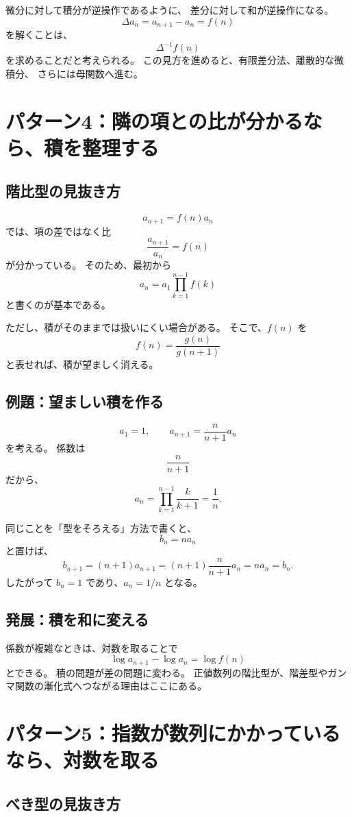 微分に対して積分が逆操作であるように、
差分に対して和が逆操作になる。
\[
  \Delta a_n=a_{n+1}-a_n=f(n)
\]
を解くことは、
\[
  \Delta^{-1}f(n)
\]
を求めることだと考えられる。
この見方を進めると、有限差分法、離散的な微積分、
さらには母関数へ進む。

\section{パターン4：隣の項との比が分かるなら、積を整理する}

\subsection{階比型の見抜き方}

\[
  a_{n+1}=f(n)a_n
\]
では、項の差ではなく比
\[
  \frac{a_{n+1}}{a_n}=f(n)
\]
が分かっている。
そのため、最初から
\[
  a_n=a_1\prod_{k=1}^{n-1}f(k)
\]
と書くのが基本である。

ただし、積がそのままでは扱いにくい場合がある。
そこで、$f(n)$ を
\[
  f(n)=\frac{g(n)}{g(n+1)}
\]
と表せれば、積が望ましく消える。

\subsection{例題：望ましい積を作る}

\[
  a_1=1,\qquad
  a_{n+1}=\frac{n}{n+1}a_n
\]
を考える。
係数は
\[
  \frac{n}{n+1}
\]
だから、
\[
  a_n
  =\prod_{k=1}^{n-1}\frac{k}{k+1}
  =\frac1n.
\]

同じことを「型をそろえる」方法で書くと、
\[
  b_n=na_n
\]
と置けば、
\[
  b_{n+1}
  =(n+1)a_{n+1}
  =(n+1)\frac{n}{n+1}a_n
  =na_n=b_n.
\]
したがって $b_n=1$ であり、$a_n=1/n$ となる。

\subsection{発展：積を和に変える}

係数が複雑なときは、対数を取ることで
\[
  \log a_{n+1}-\log a_n=\log f(n)
\]
とできる。
積の問題が差の問題に変わる。
正値数列の階比型が、階差型やガンマ関数の漸化式へつながる理由はここにある。

\section{パターン5：指数が数列にかかっているなら、対数を取る}

\subsection{べき型の見抜き方}

